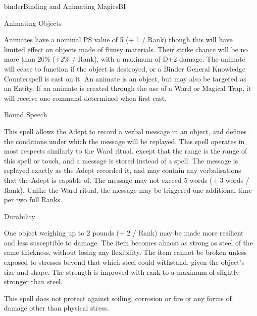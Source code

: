 \begin{college}[1.1]{binder}{Binding and Animating Magics}{BI}
\begin{spell}[G-2]{Animating Objects}
\begin{effects}
Animates have a nominal PS value of 5 (+ 1 / Rank) though this will
have limited effect on objects made of flimsy materials.  Their strike
chance will be no more than 20\% (+2\% / Rank), with a maximum of D+2
damage. The animate will cease to function if the object is destroyed,
or a Binder General Knowledge Counterspell is cast on it. An animate
is an object, but may also be targeted as an Entity. If an animate is
created through the use of a Ward or Magical Trap, it will receive one
command determined when first cast.
\end{effects}
\end{spell}

\begin{spell}[G-3]{Bound Speech}

\begin{effects}
This spell allows the Adept to record a verbal message in an object,
and defines the conditions under which the message will be
replayed. This spell operates in most respects similarly to the Ward
ritual, except that the range is the range of this spell or touch, and
a message is stored instead of a spell. The message is replayed
exactly as the Adept recorded it, and may contain any verbalisations
that the Adept is capable of. The message may not exceed 5 words (+ 3
words / Rank). Unlike the Ward ritual, the message may be triggered
one additional time per two full Ranks.
\end{effects}
\end{spell}

\begin{spell}[G-4]{Durability}

\begin{effects}
One object weighing up to 2 pounds (+ 2 / Rank) may be made more
resilient and less susceptible to damage.  The item becomes almost as
strong as steel of the same thickness, without losing any flexibility.
The item cannot be broken unless exposed to stresses beyond that which
steel could withstand, given the object's size and shape.  The
strength is improved with rank to a maximum of slightly stronger than
steel.

This spell does not protect against soiling, corrosion or fire or any
forms of damage other than physical stress.


\end{effects}
\end{spell}
\end{college}
